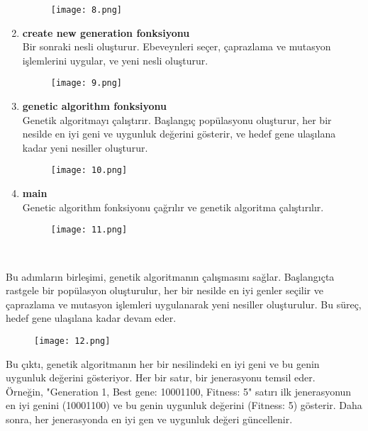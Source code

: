 \documentclass[12pt, a4paper]{article}
\begin{document}
\begin{flushleft}
\begin{enumerate}
	\begin{figure}[!h]
		\centering
		\texttt{[image: 8.png]}
		\\[20pt]
	\end{figure}
	\item \textbf{create new generation fonksiyonu}\\Bir sonraki nesli oluşturur. Ebeveynleri seçer, çaprazlama ve mutasyon işlemlerini uygular, ve yeni nesli oluşturur.
	\begin{figure}[!h]
		\centering
		\texttt{[image: 9.png]}
		\\[20pt]
	\end{figure}
	\newpage
	\item \textbf{genetic algorithm fonksiyonu}\\ Genetik algoritmayı çalıştırır. Başlangıç popülasyonu oluşturur, her bir nesilde en iyi geni ve uygunluk değerini gösterir, ve hedef gene ulaşılana kadar yeni nesiller oluşturur.
	\begin{figure}[!h]
		\centering
		\texttt{[image: 10.png]}
		\\[20pt]
	\end{figure}
	\item \textbf{main }\\ Genetic algorithm fonksiyonu çağrılır ve genetik algoritma çalıştırılır.
	\begin{figure}[!h]
		\centering
		\texttt{[image: 11.png]}
		\\[20pt]
	\end{figure}
	\\[40pt]
	
\end{enumerate}
	
	Bu adımların birleşimi, genetik algoritmanın çalışmasını sağlar. Başlangıçta rastgele bir popülasyon oluşturulur, her bir nesilde en iyi genler seçilir ve çaprazlama ve mutasyon işlemleri uygulanarak yeni nesiller oluşturulur. Bu süreç, hedef gene ulaşılana kadar devam eder.\\[20pt]
	\newpage
	
\begin{figure}[!h]
	\centering
	\texttt{[image: 12.png]}
	\\[20pt]
\end{figure}
Bu çıktı, genetik algoritmanın her bir nesilindeki en iyi geni ve bu genin uygunluk değerini gösteriyor. Her bir satır, bir jenerasyonu temsil eder.\\[20pt]

Örneğin, "Generation 1, Best gene: 10001100, Fitness: 5" satırı ilk jenerasyonun en iyi genini (10001100) ve bu genin uygunluk değerini (Fitness: 5) gösterir. Daha sonra, her jenerasyonda en iyi gen ve uygunluk değeri güncellenir.\\[20pt]


\end{flushleft}
\end{document}
